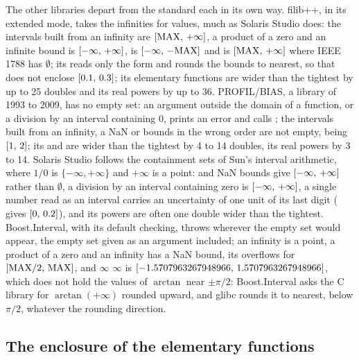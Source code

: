 \medskip
The other libraries depart from the standard each in its own way. filib++,
in its extended mode, takes the infinities for values, much as Solaris
Studio does: the intervals built from an infinity are
$[\mathrm{MAX},\,+\infty]$, a product of a zero and an infinite bound is
$[-\infty,\,+\infty]$,  is $[-\infty,\,-\mathrm{MAX}]$
and  is $[\mathrm{MAX},\,+\infty]$ where IEEE 1788 has
$\emptyset$; its  reads only the form \code{[l, u]} and
rounds the bounds to nearest, so that \code{[0.1, 0.3]} does not enclose
$[0.1,\,0.3]$; its elementary functions are wider than the tightest by
up to 25 doubles and its real powers by up to 36. PROFIL/BIAS, a library of
1993 to 2009, has no empty set: an argument outside the domain of a
function, or a division by an interval containing 0, prints an error and
calls ; the intervals built from an infinity, a NaN or bounds
in the wrong order are not empty,  being $[1,\,2]$;
its  and  are wider than the tightest by 4 to 14
doubles, its real powers by 3 to 14. Solaris Studio follows the containment
sets of Sun's interval arithmetic, where $1/0$ is $\{-\infty, +\infty\}$ and
$+\infty$ is a point:  and NaN bounds give
$[-\infty,\,+\infty]$ rather than $\emptyset$, a division by an interval
containing zero is $[-\infty,\,+\infty]$, a single number read as an
interval carries an uncertainty of one unit of its last digit (
gives $[0,\,0.2]$), and its powers are often one double wider than the
tightest. Boost.Interval, with its default checking, throws
 wherever the empty set would appear, the empty
set given as an argument included; an infinity is a point, a product of a
zero and an infinity has a NaN bound, its  overflows for
$[\mathrm{MAX}/2,\,\mathrm{MAX}]$, and \code{atan([-}$\infty$\code{, +}%
$\infty$\code{])} is $[-1.5707963267948966,\,1.5707963267948966]$, which
does not hold the values of $\arctan$ near $\pm\pi/2$: Boost.Interval asks
the C library for $\arctan(+\infty)$ rounded upward, and glibc rounds it to
nearest, below $\pi/2$, whatever the rounding direction.

\subsection{The enclosure of the elementary functions}
\label{sec:computing-enclosure}
%

